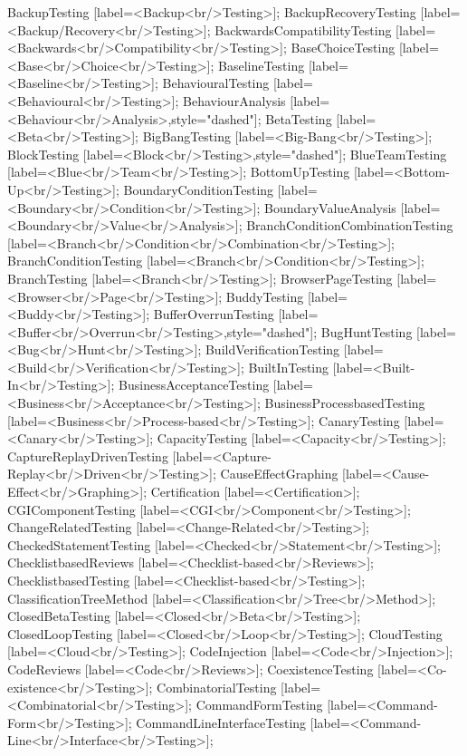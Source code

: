 \documentclass{article}
\begin{document}
{BackupTesting [label=<Backup<br/>Testing>];
BackupRecoveryTesting [label=<Backup/Recovery<br/>Testing>];
BackwardsCompatibilityTesting [label=<Backwards<br/>Compatibility<br/>Testing>];
BaseChoiceTesting [label=<Base<br/>Choice<br/>Testing>];
BaselineTesting [label=<Baseline<br/>Testing>];
BehaviouralTesting [label=<Behavioural<br/>Testing>];
BehaviourAnalysis [label=<Behaviour<br/>Analysis>,style="dashed"];
BetaTesting [label=<Beta<br/>Testing>];
BigBangTesting [label=<Big-Bang<br/>Testing>];
BlockTesting [label=<Block<br/>Testing>,style="dashed"];
BlueTeamTesting [label=<Blue<br/>Team<br/>Testing>];
BottomUpTesting [label=<Bottom-Up<br/>Testing>];
BoundaryConditionTesting [label=<Boundary<br/>Condition<br/>Testing>];
BoundaryValueAnalysis [label=<Boundary<br/>Value<br/>Analysis>];
BranchConditionCombinationTesting [label=<Branch<br/>Condition<br/>Combination<br/>Testing>];
BranchConditionTesting [label=<Branch<br/>Condition<br/>Testing>];
BranchTesting [label=<Branch<br/>Testing>];
BrowserPageTesting [label=<Browser<br/>Page<br/>Testing>];
BuddyTesting [label=<Buddy<br/>Testing>];
BufferOverrunTesting [label=<Buffer<br/>Overrun<br/>Testing>,style="dashed"];
BugHuntTesting [label=<Bug<br/>Hunt<br/>Testing>];
BuildVerificationTesting [label=<Build<br/>Verification<br/>Testing>];
BuiltInTesting [label=<Built-In<br/>Testing>];
BusinessAcceptanceTesting [label=<Business<br/>Acceptance<br/>Testing>];
BusinessProcessbasedTesting [label=<Business<br/>Process-based<br/>Testing>];
CanaryTesting [label=<Canary<br/>Testing>];
CapacityTesting [label=<Capacity<br/>Testing>];
CaptureReplayDrivenTesting [label=<Capture-Replay<br/>Driven<br/>Testing>];
CauseEffectGraphing [label=<Cause-Effect<br/>Graphing>];
Certification [label=<Certification>];
CGIComponentTesting [label=<CGI<br/>Component<br/>Testing>];
ChangeRelatedTesting [label=<Change-Related<br/>Testing>];
CheckedStatementTesting [label=<Checked<br/>Statement<br/>Testing>];
ChecklistbasedReviews [label=<Checklist-based<br/>Reviews>];
ChecklistbasedTesting [label=<Checklist-based<br/>Testing>];
ClassificationTreeMethod [label=<Classification<br/>Tree<br/>Method>];
ClosedBetaTesting [label=<Closed<br/>Beta<br/>Testing>];
ClosedLoopTesting [label=<Closed<br/>Loop<br/>Testing>];
CloudTesting [label=<Cloud<br/>Testing>];
CodeInjection [label=<Code<br/>Injection>];
CodeReviews [label=<Code<br/>Reviews>];
CoexistenceTesting [label=<Co-existence<br/>Testing>];
CombinatorialTesting [label=<Combinatorial<br/>Testing>];
CommandFormTesting [label=<Command-Form<br/>Testing>];
CommandLineInterfaceTesting [label=<Command-Line<br/>Interface<br/>Testing>];
}
\end{document}
